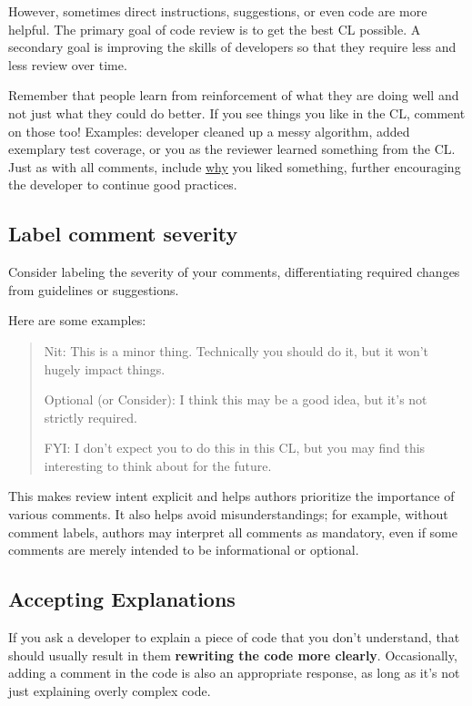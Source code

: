 \documentclass[
]{article}
\begin{document}
However, sometimes direct instructions, suggestions, or even code are
more helpful. The primary goal of code review is to get the best CL
possible. A secondary goal is improving the skills of developers so that
they require less and less review over time.

Remember that people learn from reinforcement of what they are doing
well and not just what they could do better. If you see things you like
in the CL, comment on those too! Examples: developer cleaned up a messy
algorithm, added exemplary test coverage, or you as the reviewer learned
something from the CL. Just as with all comments, include
\hyperref[why]{why} you liked something, further encouraging the
developer to continue good practices.

\subsection{Label comment severity}\label{label-comment-severity}

Consider labeling the severity of your comments, differentiating
required changes from guidelines or suggestions.

Here are some examples:

\begin{quote}
Nit: This is a minor thing. Technically you should do it, but it won't
hugely impact things.

Optional (or Consider): I think this may be a good idea, but it's not
strictly required.

FYI: I don't expect you to do this in this CL, but you may find this
interesting to think about for the future.
\end{quote}

This makes review intent explicit and helps authors prioritize the
importance of various comments. It also helps avoid misunderstandings;
for example, without comment labels, authors may interpret all comments
as mandatory, even if some comments are merely intended to be
informational or optional.

\subsection{Accepting Explanations}\label{explanations}

If you ask a developer to explain a piece of code that you don't
understand, that should usually result in them \textbf{rewriting the
code more clearly}. Occasionally, adding a comment in the code is also
an appropriate response, as long as it's not just explaining overly
complex code.
\end{document}
